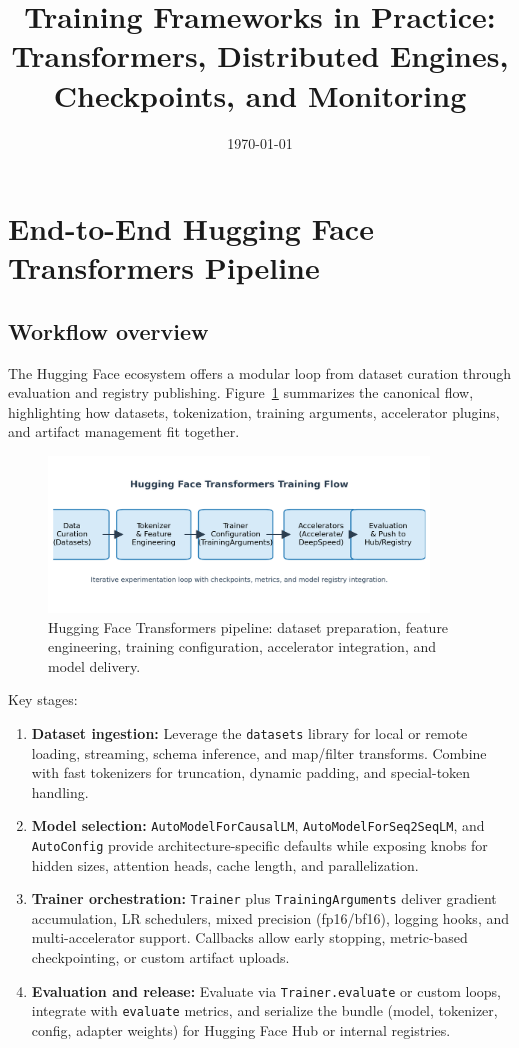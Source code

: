 \documentclass{article}
\title{Training Frameworks in Practice: Transformers, Distributed Engines, Checkpoints, and Monitoring}
\author{}
\date{\today}
\begin{document}
\maketitle

\section{End-to-End Hugging Face Transformers Pipeline}
\subsection{Workflow overview}
The Hugging Face ecosystem offers a modular loop from dataset curation through evaluation and registry publishing. Figure~\ref{fig:hf_pipeline_en_tf} summarizes the canonical flow, highlighting how datasets, tokenization, training arguments, accelerator plugins, and artifact management fit together.
\begin{figure}[H]
  \centering
  \includegraphics[width=0.9\textwidth]{hf_training_pipeline.png}
  \caption{Hugging Face Transformers pipeline: dataset preparation, feature engineering, training configuration, accelerator integration, and model delivery.}
  \label{fig:hf_pipeline_en_tf}
\end{figure}
Key stages:
\begin{enumerate}
  \item \textbf{Dataset ingestion:} Leverage the \texttt{datasets} library for local or remote loading, streaming, schema inference, and map/filter transforms. Combine with fast tokenizers for truncation, dynamic padding, and special-token handling.
  \item \textbf{Model selection:} \texttt{AutoModelForCausalLM}, \texttt{AutoModelForSeq2SeqLM}, and \texttt{AutoConfig} provide architecture-specific defaults while exposing knobs for hidden sizes, attention heads, cache length, and parallelization.
  \item \textbf{Trainer orchestration:} \texttt{Trainer} plus \texttt{TrainingArguments} deliver gradient accumulation, LR schedulers, mixed precision (fp16/bf16), logging hooks, and multi-accelerator support. Callbacks allow early stopping, metric-based checkpointing, or custom artifact uploads.
  \item \textbf{Evaluation and release:} Evaluate via \texttt{Trainer.evaluate} or custom loops, integrate with \texttt{evaluate} metrics, and serialize the bundle (model, tokenizer, config, adapter weights) for Hugging Face Hub or internal registries.
\end{enumerate}
\end{document}
